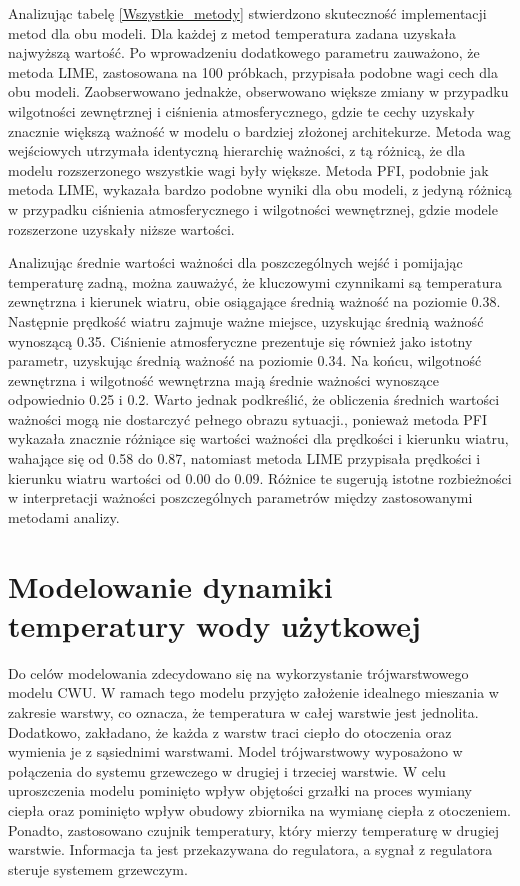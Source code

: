 \documentclass[a4paper,twoside,12pt]{book}
\begin{document}
Analizując tabelę \ref{Wszystkie_metody} stwierdzono skuteczność implementacji metod dla obu modeli. Dla każdej z metod temperatura zadana uzyskała najwyższą wartość. Po wprowadzeniu dodatkowego parametru zauważono, że metoda LIME, zastosowana na 100 próbkach, przypisała podobne wagi cech dla obu modeli. Zaobserwowano jednakże, obserwowano większe zmiany w przypadku wilgotności zewnętrznej i ciśnienia atmosferycznego, gdzie te cechy uzyskały znacznie większą ważność w modelu o bardziej złożonej architekurze. Metoda wag wejściowych utrzymała identyczną hierarchię ważności, z tą różnicą, że dla modelu rozszerzonego wszystkie wagi były większe. Metoda PFI, podobnie jak metoda LIME, wykazała bardzo podobne wyniki dla obu modeli, z jedyną różnicą w przypadku ciśnienia atmosferycznego i wilgotności wewnętrznej, gdzie modele rozszerzone uzyskały niższe wartości.

Analizując średnie wartości ważności dla poszczególnych wejść i pomijając temperaturę zadną, można zauważyć, że kluczowymi czynnikami są temperatura zewnętrzna i kierunek wiatru, obie osiągające średnią ważność na poziomie 0.38. Następnie prędkość wiatru zajmuje ważne miejsce, uzyskując średnią ważność wynoszącą 0.35. Ciśnienie atmosferyczne prezentuje się również jako istotny parametr, uzyskując średnią ważność na poziomie 0.34. Na końcu, wilgotność zewnętrzna i wilgotność wewnętrzna mają średnie ważności wynoszące odpowiednio 0.25 i 0.2. Warto jednak podkreślić, że obliczenia średnich wartości ważności mogą nie dostarczyć pełnego obrazu sytuacji., ponieważ metoda PFI wykazała znacznie różniące się wartości ważności dla prędkości i kierunku wiatru, wahające się od 0.58 do 0.87, natomiast metoda LIME przypisała prędkości i kierunku wiatru wartości od 0.00 do 0.09. Różnice te sugerują istotne rozbieżności w interpretacji ważności poszczególnych parametrów między zastosowanymi metodami analizy.


\chapter{Modelowanie dynamiki temperatury wody użytkowej}
\label{ch:05}
Do celów modelowania zdecydowano się na wykorzystanie trójwarstwowego modelu CWU. W ramach tego modelu przyjęto założenie idealnego mieszania w zakresie warstwy, co oznacza, że temperatura w całej warstwie jest jednolita. Dodatkowo, zakładano, że każda z warstw traci ciepło do otoczenia oraz wymienia je z sąsiednimi warstwami. Model trójwarstwowy wyposażono w połączenia do systemu grzewczego w drugiej i trzeciej warstwie. W celu uproszczenia modelu  pominięto wpływ objętości grzałki na proces wymiany ciepła oraz pominięto wpływ obudowy zbiornika na wymianę ciepła z otoczeniem.  Ponadto, zastosowano czujnik temperatury, który mierzy temperaturę w drugiej warstwie. Informacja ta jest przekazywana do regulatora, a sygnał z regulatora steruje systemem grzewczym.\\
\end{document}
